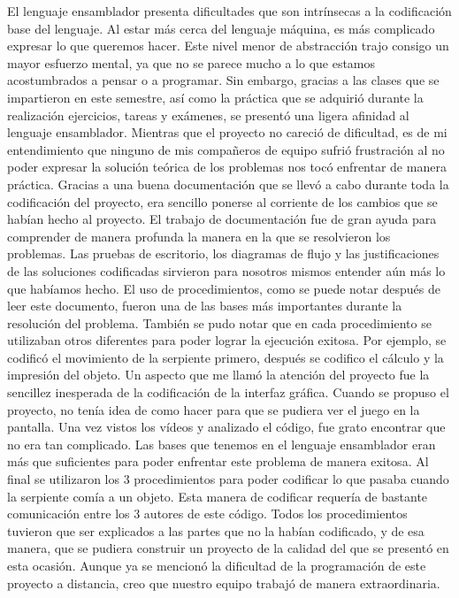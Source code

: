 \documentclass[12pt]{article}
\begin{document}
El lenguaje ensamblador presenta dificultades que son intrínsecas a la codificación base del lenguaje. Al estar más cerca del lenguaje máquina, es más complicado expresar lo que queremos hacer. Este nivel menor de abstracción trajo consigo un mayor esfuerzo mental, ya que no se parece mucho a lo que estamos acostumbrados a pensar o a programar. Sin embargo, gracias a las clases que se impartieron en este semestre, así como la práctica que se adquirió durante la realización ejercicios, tareas y exámenes, se presentó una ligera afinidad al lenguaje ensamblador. Mientras que el proyecto no careció de dificultad, es de mi entendimiento que ninguno de mis compañeros de equipo sufrió frustración al no poder expresar la solución teórica de los problemas nos tocó enfrentar de manera práctica. Gracias a una buena documentación que se llevó a cabo durante toda la codificación del proyecto, era sencillo ponerse al corriente de los cambios que se habían hecho al proyecto. 
El trabajo de documentación fue de gran ayuda para comprender de manera profunda la manera en la que se resolvieron los problemas. Las pruebas de escritorio, los diagramas de flujo y las justificaciones de las soluciones codificadas sirvieron para nosotros mismos entender aún más lo que habíamos hecho. El uso de procedimientos, como se puede notar después de leer este documento, fueron una de las bases más importantes durante la resolución del problema. También se pudo notar que en cada procedimiento se utilizaban otros diferentes para poder lograr la ejecución exitosa. Por ejemplo, se codificó el movimiento de la serpiente primero, después se codifico el cálculo y la impresión del objeto. Un aspecto que me llamó la atención del proyecto fue la sencillez inesperada de la codificación de la interfaz gráfica. Cuando se propuso el proyecto, no tenía idea de como hacer para que se pudiera ver el juego en la pantalla. Una vez vistos los vídeos y analizado el código, fue grato encontrar que no era tan complicado. Las bases que tenemos en el lenguaje ensamblador eran más que suficientes para poder enfrentar este problema de manera exitosa. Al final se utilizaron los 3 procedimientos para poder codificar lo que pasaba cuando la serpiente comía a un objeto. Esta manera de codificar requería de bastante comunicación entre los 3 autores de este código. Todos los procedimientos tuvieron que ser explicados a las partes que no la habían codificado, y de esa manera, que se pudiera construir un proyecto de la calidad del que se presentó en esta ocasión. Aunque ya se mencionó la dificultad de la programación de este proyecto a distancia, creo que nuestro equipo trabajó de manera extraordinaria. 
\end{document}

